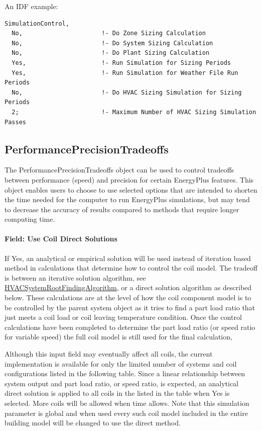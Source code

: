 An IDF example:

\begin{lstlisting}
SimulationControl,
  No,                      !- Do Zone Sizing Calculation
  No,                      !- Do System Sizing Calculation
  No,                      !- Do Plant Sizing Calculation
  Yes,                     !- Run Simulation for Sizing Periods
  Yes,                     !- Run Simulation for Weather File Run Periods
  No,                      !- Do HVAC Sizing Simulation for Sizing Periods
  2;                       !- Maximum Number of HVAC Sizing Simulation Passes
\end{lstlisting}

\subsection{PerformancePrecisionTradeoffs}\label{performanceprecisiontradeoffs}

The PerformancePrecisionTradeoffs object can be used to control tradeoffs between performance (speed) and precision for certain EnergyPlus features. This object enables users to choose to use selected options that are intended to shorten the time needed for the computer to run EnergyPlus simulations, but may tend to decrease the accuracy of results compared to methods that require longer computing time. 

\paragraph{Field: Use Coil Direct Solutions}\label{use-coil-direct-solutions}

If Yes, an analytical or empirical solution will be used instead of iteration based method in calculations that determine how to control the coil model.  The tradeoff is between an iterative solution algorithm, see \hyperref[hvacystemrootfindingalgorithm]{HVACSystemRootFindingAlgorithm}, or a direct solution algorithm as described below.  These calculations are at the level of how the coil component model is to be controlled by the parent system object as it tries to find a part load ratio that just meets a coil load or coil leaving temperature condition.  Once the control calculations have been completed to determine the part load ratio (or speed ratio for variable speed) the full coil model is still used for the final calculation,

Although this input field may eventually affect all coils, the current implementation is available for only the limited number of systems and coil configurations listed in the following table. Since a linear relationship between system output and part load ratio, or speed ratio, is expected, an analytical direct solution is applied to all coils in the listed in the table when Yes is selected. More coils will be allowed when time allows. Note that this simulation parameter is global and when used every such coil model included in the entire building model will be changed to use the direct method.

